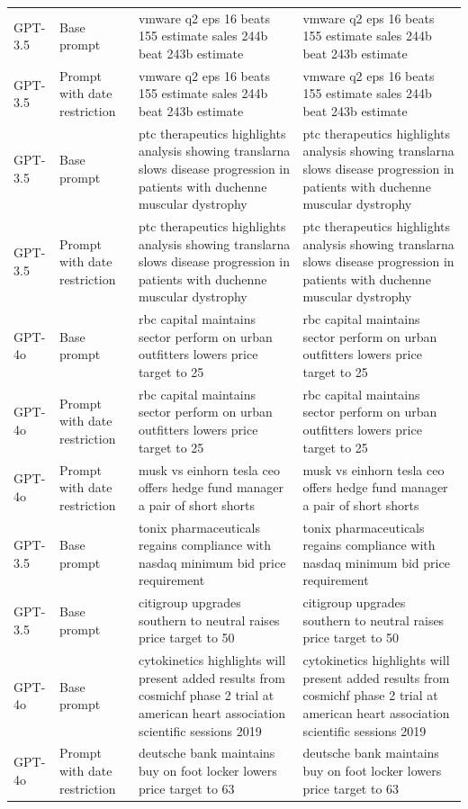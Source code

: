 \begin{longtable}{>{\raggedright\arraybackslash}p{1.4cm}>{\raggedright\arraybackslash}p{1.4cm}>{\raggedright\arraybackslash}p{5.5cm}>{\raggedright\arraybackslash}p{5.5cm}}
GPT-3.5 & Base prompt & vmware q2 eps 16 beats 155 estimate sales 244b beat 243b estimate & vmware q2 eps 16 beats 155 estimate sales 244b beat 243b estimate\\
GPT-3.5 & Prompt with date restriction & vmware q2 eps 16 beats 155 estimate sales 244b beat 243b estimate & vmware q2 eps 16 beats 155 estimate sales 244b beat 243b estimate\\
GPT-3.5 & Base prompt & ptc therapeutics highlights analysis showing translarna slows disease progression in patients with duchenne muscular dystrophy & ptc therapeutics highlights analysis showing translarna slows disease progression in patients with duchenne muscular dystrophy\\
GPT-3.5 & Prompt with date restriction & ptc therapeutics highlights analysis showing translarna slows disease progression in patients with duchenne muscular dystrophy & ptc therapeutics highlights analysis showing translarna slows disease progression in patients with duchenne muscular dystrophy\\
GPT-4o & Base prompt & rbc capital maintains sector perform on urban outfitters lowers price target to 25 & rbc capital maintains sector perform on urban outfitters lowers price target to 25\\
GPT-4o & Prompt with date restriction & rbc capital maintains sector perform on urban outfitters lowers price target to 25 & rbc capital maintains sector perform on urban outfitters lowers price target to 25\\
GPT-4o & Prompt with date restriction & musk vs einhorn tesla ceo offers hedge fund manager a pair of short shorts & musk vs einhorn tesla ceo offers hedge fund manager a pair of short shorts\\
GPT-3.5 & Base prompt & tonix pharmaceuticals regains compliance with nasdaq minimum bid price requirement & tonix pharmaceuticals regains compliance with nasdaq minimum bid price requirement\\
GPT-3.5 & Base prompt & citigroup upgrades southern to neutral raises price target to 50 & citigroup upgrades southern to neutral raises price target to 50\\
GPT-4o & Base prompt & cytokinetics highlights will present added results from cosmichf phase 2 trial at american heart association scientific sessions 2019 & cytokinetics highlights will present added results from cosmichf phase 2 trial at american heart association scientific sessions 2019\\
GPT-4o & Prompt with date restriction & deutsche bank maintains buy on foot locker lowers price target to 63 & deutsche bank maintains buy on foot locker lowers price target to 63\\

\end{longtable}
